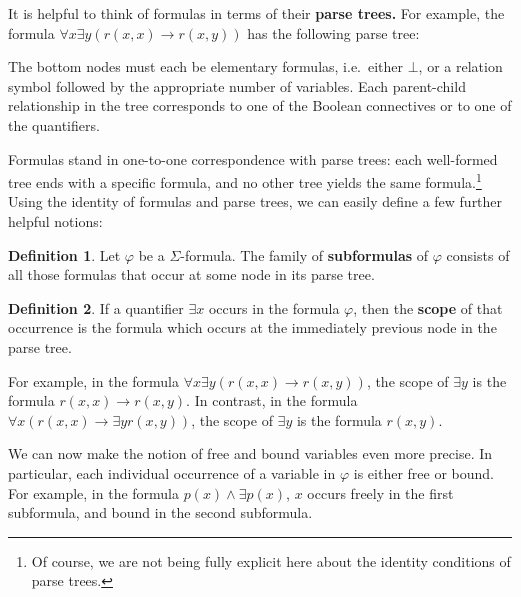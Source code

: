 \documentclass[11pt,fleqn]{article}
\theoremstyle{definition}
\newtheorem*{defn}{Definition}
\theoremstyle{remark}
\newcommand{\2}{\mathscr}
\newcommand{\vp}{\varphi}
\begin{document}
It is helpful to think of formulas in terms of their \textbf{parse
  trees.}  For example, the formula
$\forall x\exists y(r(x,x)\to r(x,y))$ has the following parse tree:

\bigskip {}

\noindent The bottom nodes must each be elementary formulas, i.e.\
either $\bot$, or a relation symbol followed by the appropriate number
of variables.  Each parent-child relationship in the tree corresponds
to one of the Boolean connectives or to one of the quantifiers.

Formulas stand in one-to-one correspondence with parse trees: each
well-formed tree ends with a specific formula, and no other tree
yields the same formula.\footnote{Of course, we are not being fully
  explicit here about the identity conditions of parse trees.}  Using
the identity of formulas and parse trees, we can easily define a few
further helpful notions:

\begin{defn} Let $\vp$ be a $\Sigma$-formula.  The family of
  \textbf{subformulas} of $\vp$ consists of all those formulas that
  occur at some node in its parse tree.  \end{defn}

\begin{defn} If a quantifier $\exists x$ occurs in the formula $\vp$,
  then the \textbf{scope} of that occurrence is the formula which
  occurs at the immediately previous node in the parse
  tree.  \end{defn}

For example, in the formula $\forall x\exists y(r(x,x)\to r(x,y))$,
the scope of $\exists y$ is the formula $r(x,x)\to r(x,y)$.  In
contrast, in the formula $\forall x(r(x,x)\to \exists yr(x,y))$, the
scope of $\exists y$ is the formula $r(x,y)$.

We can now make the notion of free and bound variables even more
precise.  In particular, each individual occurrence of a variable in
$\vp$ is either free or bound.  For example, in the formula
$p(x)\wedge \exists p(x)$, $x$ occurs freely in the first subformula,
and bound in the second subformula.
\end{document}
